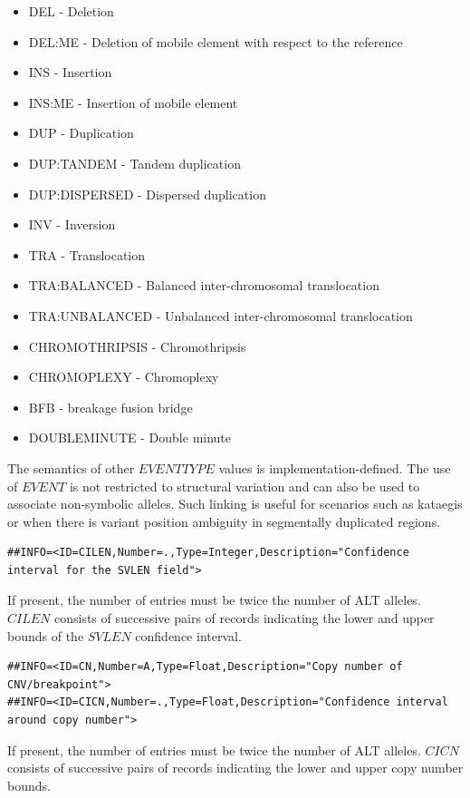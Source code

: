 \documentclass[8pt]{article}
\begin{document}
\begin{itemize}
  \item DEL - Deletion
  \item DEL:ME - Deletion of mobile element with respect to the reference
  \item INS - Insertion
  \item INS:ME - Insertion of mobile element
  \item DUP - Duplication
  \item DUP:TANDEM - Tandem duplication
  \item DUP:DISPERSED - Dispersed duplication
  \item INV - Inversion
  \item TRA - Translocation
  \item TRA:BALANCED - Balanced inter-chromosomal translocation
  \item TRA:UNBALANCED - Unbalanced inter-chromosomal translocation
  \item CHROMOTHRIPSIS - Chromothripsis
  \item CHROMOPLEXY - Chromoplexy
  \item BFB - breakage fusion bridge
  \item DOUBLEMINUTE - Double minute
\end{itemize}
The semantics of other $EVENTTYPE$ values is implementation-defined.
The use of $EVENT$ is not restricted to structural variation and can also be used to associate non-symbolic alleles.
Such linking is useful for scenarios such as kataegis or when there is variant position ambiguity in segmentally duplicated regions.

\footnotesize
\begin{verbatim}
##INFO=<ID=CILEN,Number=.,Type=Integer,Description="Confidence interval for the SVLEN field">
\end{verbatim}
\normalsize

If present, the number of entries must be twice the number of ALT alleles.
$CILEN$ consists of successive pairs of records indicating the lower and upper bounds of the $SVLEN$ confidence interval.

\footnotesize
\begin{verbatim}
##INFO=<ID=CN,Number=A,Type=Float,Description="Copy number of CNV/breakpoint">
##INFO=<ID=CICN,Number=.,Type=Float,Description="Confidence interval around copy number">
\end{verbatim}
\normalsize

If present, the number of entries must be twice the number of ALT alleles.
$CICN$ consists of successive pairs of records indicating the lower and upper copy number bounds.
\end{document}
